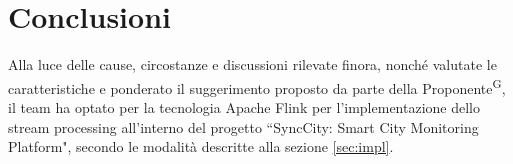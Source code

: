 \documentclass[8pt]{article}
\newcommand{\glossterm}[1]{#1\textsuperscript{G}} %
\begin{document}
\section{Conclusioni}
Alla luce delle cause, circostanze e discussioni rilevate finora, nonché valutate le caratteristiche e ponderato il suggerimento proposto da parte della \glossterm{Proponente}, il team ha optato per la tecnologia Apache Flink per l'implementazione dello stream processing all'interno del progetto ``SyncCity: Smart City Monitoring Platform", secondo le modalità descritte alla sezione \ref{sec:impl}.
\end{document}
